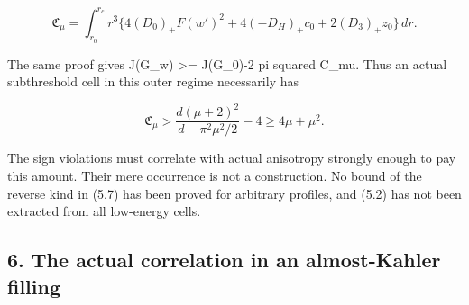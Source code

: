 \documentclass[
  10pt,
]{article}
\begin{document}
\[
 \mathfrak C_\mu=\int_{r_0}^{r_c}r^3
 \{4(D_0)_+F(w')^2+4(-D_H)_+c_0+2(D_3)_+z_0\}\,dr.
\]

The same proof gives J(G\_w) \textgreater= J(G\_0)-2 pi squared C\_mu.
Thus an actual subthreshold cell in this outer regime necessarily has

\[
 \boxed{\mathfrak C_\mu>
       \frac{d(\mu+2)^2}{d-\pi^2\mu^2/2}-4
                                      \ge4\mu+\mu^2.}   \tag{5.7}
\]

The sign violations must correlate with actual anisotropy strongly
enough to pay this amount. Their mere occurrence is not a construction.
No bound of the reverse kind in (5.7) has been proved for arbitrary
profiles, and (5.2) has not been extracted from all low-energy cells.

\hypertarget{the-actual-correlation-in-an-almost-kahler-filling}{%
\subsection{6. The actual correlation in an almost-Kahler
filling}\label{the-actual-correlation-in-an-almost-kahler-filling}}
\end{document}
